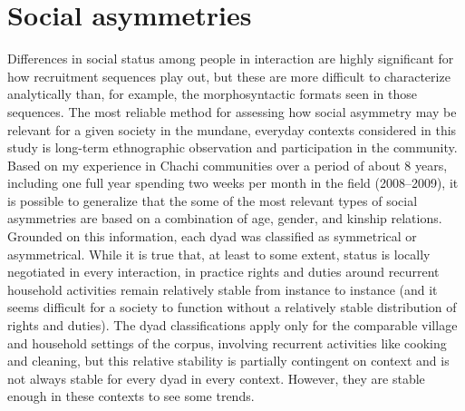 \documentclass[output=paper]{langsci/langscibook}
\begin{document}
\section{Social asymmetries}\label{sec:floyd:6}

Differences in social status among people in interaction are highly significant for how recruitment sequences play out, but these are more difficult to characterize analytically than, for example, the morphosyntactic formats seen in those sequences. The most reliable method for assessing how social asymmetry may be relevant for a given society in the mundane, everyday contexts considered in this study is long-term ethnographic observation and participation in the community. Based on my experience in Chachi communities over a period of about 8 years, including one full year spending two weeks per month in the field (2008--2009), it is possible to generalize that the some of the most relevant types of social asymmetries are based on a combination of age, gender, and kinship relations. Grounded on this information, each dyad was classified as symmetrical or asymmetrical. While it is true that, at least to some extent, status is locally negotiated in every interaction, in practice rights and duties around recurrent household activities remain relatively stable from instance to instance (and it seems difficult for a society to function without a relatively stable distribution of rights and duties). The dyad classifications apply only for the comparable village and household settings of the corpus, involving recurrent activities like cooking and cleaning, but this relative stability is partially contingent on context and is not always stable for every dyad in every context. However, they are stable enough in these contexts to see some trends.
\end{document}
